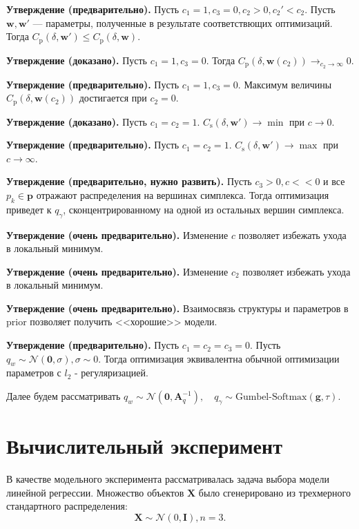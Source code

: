 \documentclass[12pt]{article}
\begin{document}
\textbf{Утверждение (предварительно).} Пусть $c_1 = 1, c_3 = 0, c_2 > 0, c_2' < c_2$. Пусть $\mathbf{w}, \mathbf{w}'$ --- параметры, полученные в результате соответствющих оптимизаций. Тогда  $C_\text{p}(\delta, \mathbf{w}') \leq C_\text{p}(\delta, \mathbf{w}).$ 

\textbf{Утверждение (доказано).} Пусть $c_1 = 1, c_3 = 0$. Тогда  $C_\text{p}(\delta, \mathbf{w}(c_2)) \to_{c_2 \to \infty} 0$. 


\textbf{Утверждение (предварительно).} Пусть $c_1 = 1, c_3 = 0$. Максимум величины $C_\text{p}(\delta, \mathbf{w}(c_2))$ достигается при $c_2= 0$. 


\textbf{Утверждение (доказано).} Пусть $c_1 = c_2 = 1$. $C_\text{s}(\delta, \mathbf{w}')  \to \min$ при $c \to 0$.


\textbf{Утверждение (предварительно).} Пусть $c_1 = c_2 = 1$. $C_\text{s}(\delta, \mathbf{w}')  \to \max$ при $c \to \infty$.

\textbf{Утверждение (предварительно, нужно развить).} Пусть $c_3 > 0, c << 0$ и все $p_k \in \mathbf{p}$ отражают распределения на вершинах симплекса. Тогда оптимизация приведет к $q_\gamma$, сконцентрированному на одной из остальных вершин симплекса.

\textbf{Утверждение (очень предварительно).} Изменение $c$ позволяет избежать ухода в локальный минимум. 

\textbf{Утверждение (очень предварительно).} Изменение $c_2$ позволяет избежать ухода в локальный минимум.

\textbf{Утверждение (очень предварительно).} Взаимосвязь структуры и параметров в prior позволяет получить <<хорошие>> модели.

\textbf{Утверждение (предварительно).} Пусть $c_1 = c_2 = c_3 = 0$. Пусть $q_w \sim \mathcal{N}(\mathbf{0}, \sigma), \sigma \sim 0$. 
Тогда оптимизация эквивалентна обычной оптимизации параметров с $l_2$ - регуляризацией.

Далее будем рассматривать $q_w \sim \mathcal{N}(\mathbf{0}, \mathbf{A}_q^{-1}), \quad q_\gamma \sim \text{Gumbel-Softmax}(\mathbf{g}, \tau).$

\section{Вычислительный эксперимент}
В качестве модельного эксперимента рассматривалась задача выбора модели линейной регрессии.
Множество объектов $\mathbf{X}$ было сгенерировано из трехмерного стандартного распределения: 
\[
    \mathbf{X} \sim \mathcal{N}(0, \mathbf{I}), n = 3.
\]
\end{document}
